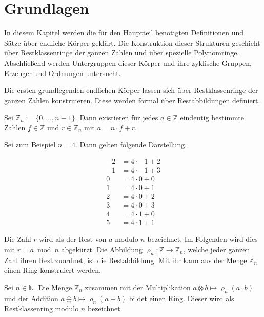 \section{Grundlagen}

In diesem Kapitel werden die für den Hauptteil benötigten Definitionen und Sätze über endliche Körper geklärt. Die Konstruktion dieser Strukturen geschieht über Restklassenringe der ganzen Zahlen und über spezielle Polynomringe. Abschließend werden Untergruppen dieser Körper und ihre zyklische Gruppen, Erzeuger und Ordnungen untersucht.


Die ersten grundlegenden endlichen Körper lassen sich über Restklassenringe der ganzen Zahlen konstruieren. Diese werden formal über Restabbildungen definiert.

\begin{satz}
    Sei $\mathbb{Z}_n := \{0,\dots,n-1\}$. Dann existieren für jedes $a \in \mathbb{Z}$ eindeutig bestimmte Zahlen $f \in \mathbb{Z}$ und $r \in \mathbb{Z}_n$ mit $a = n \cdot f + r$.
\end{satz}

Sei zum Beispiel $n = 4$. Dann gelten folgende Darstellung.

\begin{align*}
    -2 &= 4 \cdot -1 + 2 \\
    -1 &= 4 \cdot -1 + 3 \\
    0 &= 4 \cdot 0 + 0 \\
    1 &= 4 \cdot 0 + 1 \\
    2 &= 4 \cdot 0 + 2 \\
    3 &= 4 \cdot 0 + 3 \\
    4 &= 4 \cdot 1 + 0 \\
    5 &= 4 \cdot 1 + 1
\end{align*}

Die Zahl $r$ wird als der Rest von $a$ modulo $n$ bezeichnet. Im Folgenden wird dies mit $r = a \bmod n$ abgekürzt. Die Abbildung $\varrho_n : \mathbb{Z} \rightarrow \mathbb{Z}_n$, welche jeder ganzen Zahl ihren Rest zuordnet, ist die Restabbildung. Mit ihr kann aus der Menge $\mathbb{Z}_n$ einen Ring konstruiert werden.

\begin{satz}
    Sei $n \in \mathbb{N}$. Die Menge $\mathbb{Z}_n$ zusammen mit der Multiplikation $a \otimes b \mapsto \varrho_n(a \cdot b)$ und der Addition $a \oplus b \mapsto \varrho_n(a + b)$ bildet einen Ring. Dieser wird als Restklassenring modulo $n$ bezeichnet.
\end{satz}

